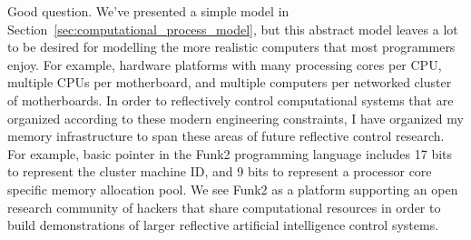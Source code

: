 Good question.  We've presented a simple model in
Section~\ref{sec:computational_process_model}, but this abstract model
leaves a lot to be desired for modelling the more realistic computers
that most programmers enjoy.  For example, hardware platforms with
many processing cores per CPU, multiple CPUs per motherboard, and
multiple computers per networked cluster of motherboards.  In order to
reflectively control computational systems that are organized
according to these modern engineering constraints, I have organized my
memory infrastructure to span these areas of future reflective control
research.  For example, basic pointer in the Funk2 programming
language includes 17 bits to represent the cluster machine ID, and 9
bits to represent a processor core specific memory allocation pool.
We see Funk2 as a platform supporting an open research community of
hackers that share computational resources in order to build
demonstrations of larger reflective artificial intelligence control
systems.

